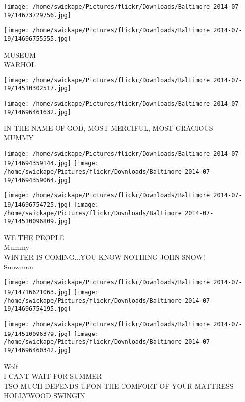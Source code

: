 \documentclass[10pt,letterpaper]{article}
\begin{document}
\texttt{[image: /home/swickape/Pictures/flickr/Downloads/Baltimore 2014-07-19/14673729756.jpg]}

\vspace{0.25in}
\texttt{[image: /home/swickape/Pictures/flickr/Downloads/Baltimore 2014-07-19/14696755555.jpg]}

MUSEUM\\
WARHOL\\
\pagebreak

\texttt{[image: /home/swickape/Pictures/flickr/Downloads/Baltimore 2014-07-19/14510302517.jpg]}

\vspace{0.25in}
\texttt{[image: /home/swickape/Pictures/flickr/Downloads/Baltimore 2014-07-19/14696461632.jpg]}

IN THE NAME OF GOD, MOST MERCIFUL, MOST GRACIOUS\\
MUMMY\\
\pagebreak

\texttt{[image: /home/swickape/Pictures/flickr/Downloads/Baltimore 2014-07-19/14694359144.jpg]}
\texttt{[image: /home/swickape/Pictures/flickr/Downloads/Baltimore 2014-07-19/14694359064.jpg]}

\texttt{[image: /home/swickape/Pictures/flickr/Downloads/Baltimore 2014-07-19/14696754725.jpg]}
\texttt{[image: /home/swickape/Pictures/flickr/Downloads/Baltimore 2014-07-19/14510096809.jpg]}

WE THE PEOPLE\\
Mummy\\
WINTER IS COMING...YOU KNOW NOTHING JOHN SNOW!\\
Snowman\\
\pagebreak

\texttt{[image: /home/swickape/Pictures/flickr/Downloads/Baltimore 2014-07-19/14716621063.jpg]}
\texttt{[image: /home/swickape/Pictures/flickr/Downloads/Baltimore 2014-07-19/14696754195.jpg]}

\texttt{[image: /home/swickape/Pictures/flickr/Downloads/Baltimore 2014-07-19/14510096379.jpg]}
\texttt{[image: /home/swickape/Pictures/flickr/Downloads/Baltimore 2014-07-19/14696460342.jpg]}

Wolf\\
I CANT WAIT FOR SUMMER\\
TSO MUCH DEPENDS UPON THE COMFORT OF YOUR MATTRESS\\
HOLLYWOOD SWINGIN\\
\pagebreak
\end{document}

